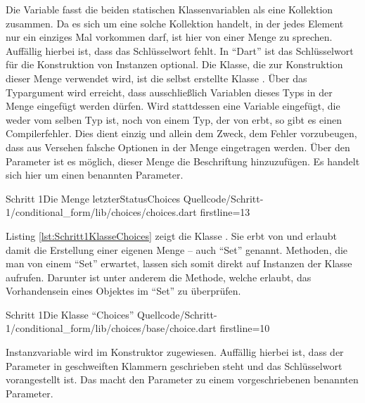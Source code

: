 Die Variable   fasst die beiden statischen Klassenvariablen als eine Kollektion zusammen.
Da es sich um eine solche Kollektion handelt, in der jedes Element nur ein einziges Mal vorkommen darf, ist hier von einer Menge zu sprechen.
Auffällig hierbei ist, dass das Schlüsselwort  fehlt.
In \enquote{Dart} ist das Schlüsselwort für die Konstruktion von Instanzen optional.
Die Klasse, die zur Konstruktion dieser Menge verwendet wird, ist die selbst erstellte Klasse .
Über das Typargument  wird erreicht, dass ausschließlich Variablen  dieses Typs in der Menge eingefügt werden dürfen.
Wird stattdessen eine Variable eingefügt, die weder vom selben Typ ist, noch von einem Typ, der von  erbt, so gibt es einen Compilerfehler.
Dies dient einzig und allein dem Zweck, dem  Fehler vorzubeugen, dass aus Versehen falsche Optionen in der Menge eingetragen werden.
Über den Parameter  ist es möglich, dieser Menge die Beschriftung  hinzuzufügen.
 Es handelt sich hier um einen  benannten Parameter.

\begin{alexlisting}{Schritt 1}{Die Menge letzterStatusChoices}
  {Quellcode/Schritt-1/conditional_form/lib/choices/choices.dart}
  {firstline=13}
  \label{lst:Schritt1DieMengeLetzterStatusChoices}
\end{alexlisting}



Listing \ref{lst:Schritt1KlasseChoices} zeigt die Klasse .
Sie erbt von  und erlaubt damit die Erstellung  einer eigenen Menge -- auch \enquote{Set} genannt.
Methoden, die man von einem \enquote{Set} erwartet,  lassen sich somit direkt auf  Instanzen der Klasse  aufrufen.
Darunter ist unter anderem die  Methode,  welche erlaubt, das Vorhandensein eines Objektes im \enquote{Set} zu überprüfen.

\begin{alexlisting}{Schritt 1}{Die Klasse \enquote{Choices}}
  {Quellcode/Schritt-1/conditional_form/lib/choices/base/choice.dart}
  {firstline=10}
  \label{lst:Schritt1KlasseChoices}
\end{alexlisting}

Instanzvariable   wird im Konstruktor  zugewiesen.
Auffällig hierbei ist, dass der Parameter in geschweiften Klammern geschrieben steht und das Schlüsselwort   vorangestellt ist.
Das macht den Parameter zu einem vorgeschriebenen benannten Parameter.

